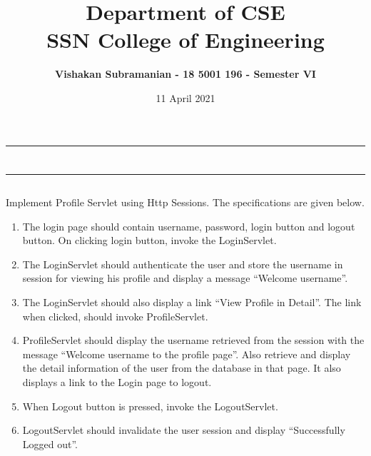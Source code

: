 \documentclass[12pt, a4]{article}
\title{\textbf{Department of CSE\\SSN College of Engineering}}
\author{\textbf{Vishakan Subramanian - 18 5001 196 - Semester VI}}
\date{11 April 2021}
\begin{document}
\maketitle
\hrule
\section*{}
\hrule
\bigskip

\subsection*{}
\subsection*{}
\begin{flushleft}
Implement Profile Servlet using Http Sessions. The specifications are given below.

\begin{enumerate}
\item The login page should contain username, password, login button and
logout button. On clicking login button, invoke the LoginServlet.
\item The LoginServlet should authenticate the user and store the username in
session for viewing his profile and display a message “Welcome username”. 
\item The LoginServlet should also display a link “View Profile in Detail”. The link when clicked, should invoke ProfileServlet.
\item ProfileServlet should display the username retrieved from the session with the message “Welcome username to the profile page”. Also retrieve and
display the detail information of the user from the database in that page. It
also displays a link to the Login page to logout.
\item When Logout button is pressed, invoke the LogoutServlet. 
\item LogoutServlet should invalidate the user session and display “Successfully Logged out”.
\end{enumerate}
 
\end{flushleft}

\newpage
\subsection*{}
\begin{flushleft}

\end{flushleft}
\end{document}
